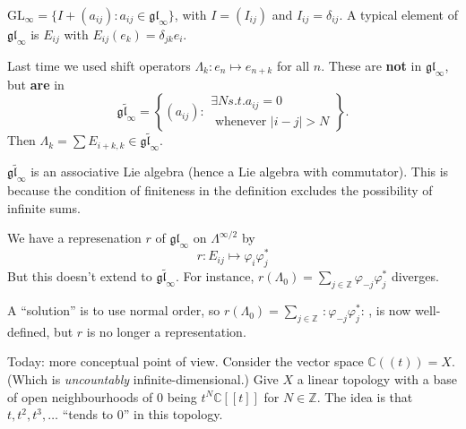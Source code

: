 $\text{GL}_\infty=\{I+(a_{ij}):a_{ij}\in\mathfrak{gl}_\infty\}$,
with $I=(I_{ij})$ and $I_{ij}=\delta_{ij}$.
A typical element of $\mathfrak{gl}_\infty$ 
is $E_{ij}$ with $E_{ij}(e_k)=\delta_{jk}e_i$.

Last time we used shift operators
$\Lambda_k:e_n\mapsto e_{n+k}$ for all $n$.
These are {\bf not} in $\mathfrak{gl}_\infty$,
but {\bf are} in 
$$
\widetilde{\mathfrak{gl}_\infty}
=\left\{(a_{ij}):\substack{\exists  N s.t. a_{ij}=0 \\ \text{ whenever }
|i-j|>N}\right\}.
$$
Then $\Lambda_k=\sum E_{i+k,k}\in \widetilde{\mathfrak{gl}_\infty}$.

\begin{remark}
\label{remark-gltilde-is-Lie-algebra}
$\widetilde{\mathfrak{gl}_\infty}$ is an associative
Lie algebra (hence a Lie algebra with commutator).
This is because the condition of finiteness in the definition
excludes the possibility of infinite sums.
\end{remark}


We have a represenation $r$ of $\mathfrak{gl}_\infty$ 
on $\Lambda^{\infty/2}$ by
$$
r:E_{ij}\mapsto \varphi_i\varphi_j^*
$$
But this doesn't extend to $\widetilde{\mathfrak{gl}_\infty}$.
For instance, $r(\Lambda_0)=\sum_{j \in \mathbb{Z}}\varphi_{-j}\varphi^*_j$ 
diverges.

A ``solution'' is to use normal order,
so $r(\Lambda_0)=\sum_{j \in \mathbb{Z}}\,:\!\varphi_{-j}\varphi^*_j\!:\,$,
is now well-defined, but $r$ is no longer a representation.

\medskip\noindent
Today: more conceptual point of view.
Consider the vector space $\mathbb{C}(\!(t)\!)=X$.
(Which is {\it uncountably} infinite-dimensional.)
Give $X$ a linear topology
with a base of open neighbourhoods
of $0$ being $t^N\mathbb{C}[\![t]\!]$
for $N \in \mathbb{Z}$.
The idea is that
$t,t^2,t^3,\ldots$ ``tends to $0$''
in this topology.

